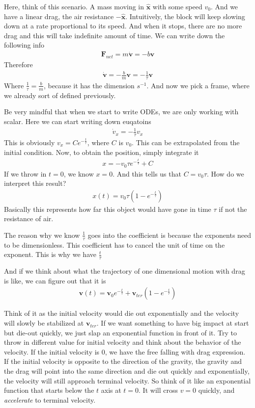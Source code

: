 \documentclass[12pt]{article}
\newcommand{\paren}[1]{\left( #1 \right)}
\newcommand{\unx}{\hat{\mathbf{x}}}
\begin{document}
Here, think of this scenario. A mass moving in $\unx$ with some speed $v_0$. And we have a linear drag, the air resistance $-\unx$. Intuitively, the block will keep slowing down at a rate proportional to its speed. And when it stops, there are no more drag and this will take indefinite amount of time. We can write down the following info
\begin{align}
\mathbf{F}_{net} = m\dot{\mathbf{v}} = -b\mathbf{v}
\end{align}
Therefore
\begin{align}
\dot{\mathbf{v}} = -\frac{b}{m}\mathbf{v} = -\frac{1}{\tau}\mathbf{v}
\end{align}
Where $\frac{1}{\tau} = \frac{b}{m}$, because it has the dimension $s^{-1}$. And now we pick a frame, where we already sort of defined previously. 

Be very mindful that when we start to write ODEs, we are only working with scalar. Here we can start writing down euqatoins
\begin{align}
\dot{v}_x = -\frac{1}{\tau}v_x
\end{align}
This is obviously $v_x = Ce^{-\frac{t}{\tau}}$, where $C$ is $v_0$. This can be extrapolated from the initial condition. Now, to obtain the position, simply integrate it
\begin{align}
x = -v_0\tau e^{-\frac{t}{\tau}} + C
\end{align}
If we throw in $t=0$, we know $x=0$. And this tells us that $C = v_0\tau$. How do we interpret this result?
\begin{align}
x(t) = v_0\tau\paren{1 - e^{-\frac{t}{\tau}}}
\end{align}
Basically this represents how far this object would have gone in time $\tau$ if not the resistance of air. 

The reason why we know $\frac{1}{\tau}$ goes into the coefficient is because the exponents need to be dimensionless. This coefficient has to cancel the unit of time on the exponent. This is why we have $\frac{t}{\tau}$

And if we think about what the trajectory of one dimensional motion with drag is like, we can figure out that it is
\begin{align}
\mathbf{v}(t) = \mathbf{v}_0 e^{-\frac{t}{\tau}} + \mathbf{v}_{ter}\paren{1-e^{-\frac{t}{\tau}}}
\end{align}

Think of it as the initial velocity would die out exponentially and the velocity will slowly be stabilized at $\mathbf{v}_{ter}$. If we want something to have big impact at start but die-out quickly, we just slap an exponential function in front of it. Try to throw in different value for initial velocity and think about the behavior of the velocity. 
If the initial velocity is $0$, we have the free falling with drag expression.
If the initial velocity is opposite to the direction of the gravity, the gravity and the drag will point into the same direction and die out quickly and exponentially, the velocity will still approach terminal velocity. So think of it like an exponential function that starts below the $t$ axis at $t=0$. It will cross $v=0$ quickly, and \textit{accelerate} to terminal velocity.
\end{document}
